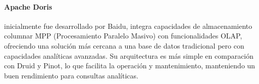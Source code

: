 \paragraph{Apache Doris} 
inicialmente fue desarrollado por Baidu, integra capacidades de almacenamiento columnar MPP (Procesamiento Paralelo Masivo) con funcionalidades OLAP, 
ofreciendo una solución más cercana a una base de datos tradicional pero con capacidades analíticas avanzadas. 
Su arquitectura es más simple en comparación con Druid y Pinot, lo que facilita la operación y mantenimiento, manteniendo un buen rendimiento para consultas analíticas.